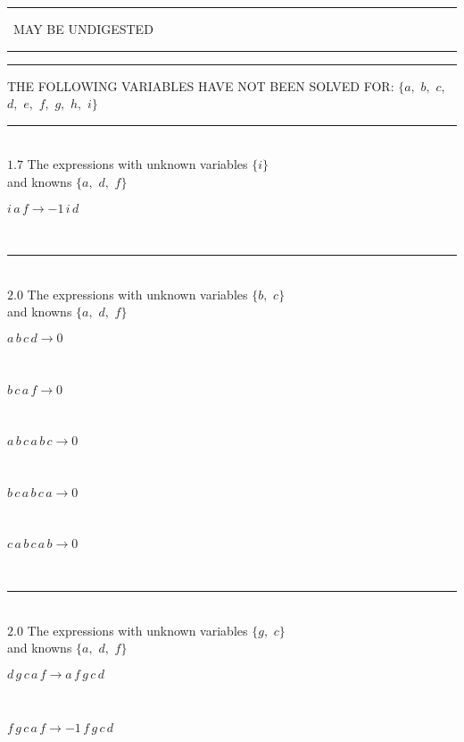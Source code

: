 \documentclass[rep10,leqno]{report}
\begin{document}
\rule[2pt]{2.18in}{4pt}
\ MAY BE UNDIGESTED\ 
\rule[2pt]{2.18in}{4pt}\hfil\break
\rule[2pt]{6in}{4pt}\hfil\break
THE FOLLOWING VARIABLES HAVE NOT BEEN SOLVED FOR:\hfil\break
$\{a,
$ $
b,
$ $
c,
$ $
d,
$ $
e,
$ $
f,
$ $
g,
$ $
h,
$ $
i\}$
\smallskip\\
\rule[3pt]{6in}{.7pt}\\
$1.7$  The expressions with unknown variables $\{i\}$\\
and knowns $\{a,
$ $
d,
$ $
f\}$\smallskip\\
\begin{minipage}{6in}
$
i\,
 a\,
 f\rightarrow -1\,
 i\,
 d
$
\end{minipage}\\
\rule[3pt]{6in}{.7pt}\\
$2.0$  The expressions with unknown variables $\{b,
$ $
c\}$\\
and knowns $\{a,
$ $
d,
$ $
f\}$\smallskip\\
\begin{minipage}{6in}
$
a\,
 b\,
 c\,
 d\rightarrow 0
$
\end{minipage}\medskip \\
\begin{minipage}{6in}
$
b\,
 c\,
 a\,
 f\rightarrow 0
$
\end{minipage}\medskip \\
\begin{minipage}{6in}
$
a\,
 b\,
 c\,
 a\,
 b\,
 c\rightarrow 0
$
\end{minipage}\medskip \\
\begin{minipage}{6in}
$
b\,
 c\,
 a\,
 b\,
 c\,
 a\rightarrow 0
$
\end{minipage}\medskip \\
\begin{minipage}{6in}
$
c\,
 a\,
 b\,
 c\,
 a\,
 b\rightarrow 0
$
\end{minipage}\\
\rule[3pt]{6in}{.7pt}\\
$2.0$  The expressions with unknown variables $\{g,
$ $
c\}$\\
and knowns $\{a,
$ $
d,
$ $
f\}$\smallskip\\
\begin{minipage}{6in}
$
d\,
 g\,
 c\,
 a\,
 f\rightarrow a\,
 f\,
 g\,
 c\,
 d
$
\end{minipage}\medskip \\
\begin{minipage}{6in}
$
f\,
 g\,
 c\,
 a\,
 f\rightarrow -1\,
 f\,
 g\,
 c\,
 d
$
\end{minipage}\medskip \\
\end{document}
